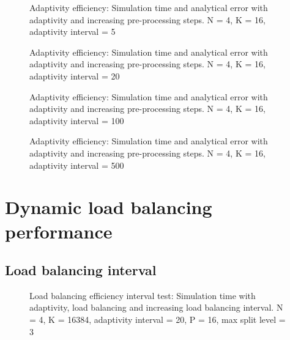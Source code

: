 \begin{figure}[H]
	\centering
	
	\caption{Adaptivity efficiency: Simulation time and analytical error with adaptivity and increasing pre-processing steps. N = 4, K = 16, adaptivity interval = 5}
	\label{fig:adaptivity_efficiency_C5}
\end{figure}

\begin{figure}[H]
	\centering
	
	\caption{Adaptivity efficiency: Simulation time and analytical error with adaptivity and increasing pre-processing steps. N = 4, K = 16, adaptivity interval = 20}
	\label{fig:adaptivity_efficiency_C20}
\end{figure}

\begin{figure}[H]
	\centering
	
	\caption{Adaptivity efficiency: Simulation time and analytical error with adaptivity and increasing pre-processing steps. N = 4, K = 16, adaptivity interval = 100}
	\label{fig:adaptivity_efficiency_C100}
\end{figure}

\begin{figure}[H]
	\centering
	
	\caption{Adaptivity efficiency: Simulation time and analytical error with adaptivity and increasing pre-processing steps. N = 4, K = 16, adaptivity interval = 500}
	\label{fig:adaptivity_efficiency_C500}
\end{figure}

\section{Dynamic load balancing performance} \label{section:results:load_balancing_performance}


\subsection{Load balancing interval} \label{section:results:load_balancing_performance:interval}

\begin{figure}[H]
	\centering
	
	\caption{Load balancing efficiency interval test: Simulation time with adaptivity, load balancing and increasing load balancing interval. N = 4, K = 16384, adaptivity interval = 20, P = 16, max split level = 3}
	\label{fig:load_balancing_efficiency_interval}
\end{figure}


